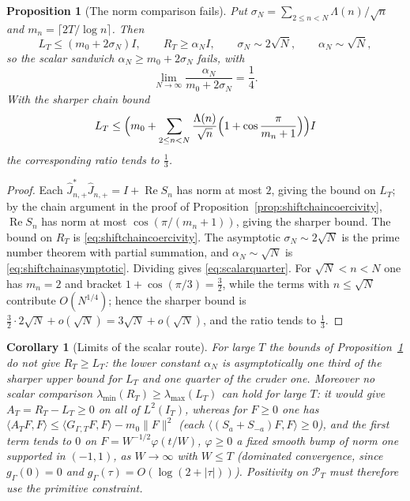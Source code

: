 \documentclass[11pt]{amsart}
\newtheorem{proposition}[theorem]{Proposition}
\newtheorem{corollary}[theorem]{Corollary}
\theoremstyle{definition}
\theoremstyle{remark}
\begin{document}
\begin{proposition}[The norm comparison fails]
\label{prop:scalarnogo}
Put \(\sigma_N=\sum_{2\le n<N}\Lambda(n)/\sqrt n\) and
\(m_n=\lceil2T/\log n\rceil\).  Then
\[
 L_T\le(m_0+2\sigma_N)I,
 \qquad
 R_T\ge\alpha_NI,
 \qquad
 \sigma_N\sim2\sqrt N,
 \qquad
 \alpha_N\sim\sqrt N,
\]
so the scalar sandwich \(\alpha_N\ge m_0+2\sigma_N\) fails, with
\begin{equation}\label{eq:scalarquarter}
 \lim_{N\to\infty}\frac{\alpha_N}{m_0+2\sigma_N}=\frac14 .
\end{equation}
With the sharper chain bound
\[
 L_T\le\Bigl(m_0+\sum_{2\le n<N}\frac{\Lambda(n)}{\sqrt n}
   \Bigl(1+\cos\frac{\pi}{m_n+1}\Bigr)\Bigr)I
\]
the corresponding ratio tends to \(\tfrac13\).
\end{proposition}

\begin{proof}
Each \(\widehat J_{n,+}^*\widehat J_{n,+}=I+\operatorname{Re}S_n\) has norm at
most \(2\), giving the bound on \(L_T\); by the chain argument in the proof
of Proposition~\ref{prop:shiftchaincoercivity}, \(\operatorname{Re}S_n\) has
norm at most \(\cos(\pi/(m_n+1))\), giving the sharper bound.  The bound on
\(R_T\) is
\eqref{eq:shiftchaincoercivity}.  The asymptotic
\(\sigma_N\sim2\sqrt N\) is the prime number theorem with partial summation,
and \(\alpha_N\sim\sqrt N\) is \eqref{eq:shiftchainasymptotic}.  Dividing
gives \eqref{eq:scalarquarter}.  For \(\sqrt N<n<N\) one has \(m_n=2\) and
bracket \(1+\cos(\pi/3)=\tfrac32\), while the terms with \(n\le\sqrt N\)
contribute \(O(N^{1/4})\); hence the sharper bound is
\(\tfrac32\cdot2\sqrt N+o(\sqrt N)=3\sqrt N+o(\sqrt N)\), and the ratio tends
to \(\tfrac13\).
\end{proof}

\begin{corollary}[Limits of the scalar route]
\label{cor:scalarnogo}
For large \(T\) the bounds of Proposition~\ref{prop:scalarnogo} do not give
\(R_T\ge L_T\): the lower constant \(\alpha_N\) is asymptotically one third
of the sharper upper bound for \(L_T\) and one quarter of the cruder one.  Moreover no scalar comparison
\(\lambda_{\min}(R_T)\ge\lambda_{\max}(L_T)\) can hold for large \(T\): it
would give \(A_T=R_T-L_T\ge0\) on all of \(L^2(I_T)\), whereas for
\(F\ge0\) one has \(\langle A_TF,F\rangle\le\langle G_{\Gamma,T}F,F\rangle
-m_0\|F\|^2\) (each \(\langle(S_a+S_{-a})F,F\rangle\ge0\)), and the first term
tends to \(0\) on \(F=W^{-1/2}\varphi(t/W)\), \(\varphi\ge0\) a fixed smooth
bump of norm one supported in \((-1,1)\), as \(W\to\infty\) with \(W\le T\)
(dominated convergence, since \(g_\Gamma(0)=0\) and
\(g_\Gamma(\tau)=O(\log(2+|\tau|))\)).  Positivity on \(\mathcal P_T\) must
therefore use the primitive constraint.
\end{corollary}
\end{document}
